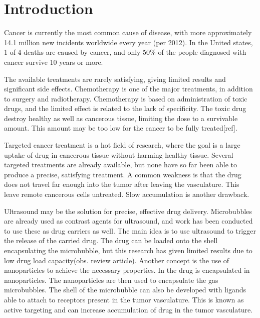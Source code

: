 \section{Introduction}

Cancer is currently the most common cause of disease, with more approximately 14.1 million new incidents worldwide every year (per 2012)\cite{cancer1}. In the United states, 1 of 4 deaths are caused by cancer\cite{Siegel2014}, and only 50\% of the people diagnosed with cancer survive 10 years or more. 

The available treatments are rarely satisfying, giving limited results and significant side effects. Chemotherapy is one of the major treatments, in addition to surgery and radiotherapy. Chemotherapy is based on administration of toxic drugs, and the limited effect is related to the lack of specificity. The toxic drug destroy healthy as well as cancerous tissue, limiting the dose to a survivable amount. This amount may be too low for the cancer to be fully treated[ref].

Targeted cancer treatment is a hot field of research, where the goal is a large uptake of drug in cancerous tissue without harming healthy tissue. Several targeted treatments are already available, but none have so far been able to produce a precise,  satisfying treatment. A common weakness is that the drug does not travel far enough into the tumor after leaving the vasculature. This leave remote cancerous cells untreated. Slow accumulation is another drawback. 

Ultrasound may be the solution for precise, effective drug delivery. Microbubbles are already used as contrast agents for ultrasound, and work has been conducted to use these as drug carriers as well. The main idea is to use ultrasound to trigger the release of the carried drug. The drug can be loaded onto the shell encapsulating the microbubble, but this research has given limited results due to low drug load capacity\cite{Ibsen2011}(obs. review article). Another concept is the use of nanoparticles to achieve the necessary properties. In \cite{Eggen2013} the drug is encapsulated in nanoparticles. The nanoparticles are then used to encapsulate the gas microbubbles. The shell of the microbubble can also be developed with ligands able to attach to receptors present in the tumor vasculature. This is known as active targeting and can increase accumulation of drug in the tumor vasculature.

